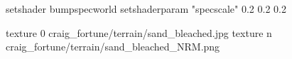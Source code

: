setshader bumpspecworld
setshaderparam "specscale" 0.2 0.2 0.2

texture 0 craig_fortune/terrain/sand_bleached.jpg
texture n craig_fortune/terrain/sand_bleached_NRM.png
